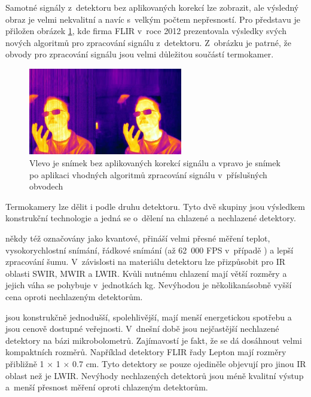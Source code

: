     Samotné signály z~detektoru bez aplikovaných korekcí lze zobrazit, ale výsledný obraz je velmi nekvalitní a navíc s~velkým počtem nepřesností. Pro představu je přiložen obrázek \ref{fig:flir_signal_image}, kde firma FLIR v~roce 2012 prezentovala výsledky svých nových algoritmů pro zpracování signálu z~detektoru.  Z~obrázku je patrné, že obvody pro zpracování signálu jsou velmi důležitou součástí termokamer.
    
    \begin{figure}[h]
      \centering
      \includegraphics[width=0.6\textwidth]{images/flir_filter_with_without.jpg}
      \caption{Vlevo je snímek bez aplikovaných korekcí signálu a vpravo je snímek po aplikaci vhodných algoritmů zpracování signálu v~příslušných obvodech \cite{flirFPGAsignal}}
      \label{fig:flir_signal_image}
	\end{figure}    
    
    Termokamery lze dělit i podle druhu detektoru. Tyto dvě skupiny jsou výsledkem konstrukční technologie a jedná se o~dělení na chlazené a nechlazené detektory.
        
	\begin{description}[align=left]\label{description:detector_types}
      \item [Chlazené detektory,] někdy též označovány jako kvantové, přináší velmi přesné měření teplot, vysokorychlostní snímání, řádkové snímání (až 62~000 FPS v~případě \cite{flirSc7000}) a lepší zpracování šumu. V~závislosti na materiálu detektoru lze přizpůsobit pro IR oblasti SWIR, MWIR a LWIR. Kvůli nutnému chlazení mají větší rozměry a jejich váha se pohybuje v~jednotkách kg. Nevýhodou je několikanásobně vyšší cena oproti nechlazeným detektorům.
      \item [Nechlazené detektory] jsou konstrukčně jednodušší, spolehlivější, mají menší energetickou spotřebu a jsou cenově dostupné veřejnosti. V~dnešní době jsou nejčastější nechlazené detektory na bázi mikrobolometrů. Zajímavostí je fakt, že se dá dosáhnout velmi kompaktních rozměrů. Například detektory FLIR řady Lepton mají rozměry přibližně 1 $\times$ 1 $\times$ 0.7 cm. Tyto detektory se pouze ojediněle objevují pro jinou IR oblast než je LWIR. Nevýhody nechlazených detektorů jsou méně kvalitní výstup a~menší přesnost měření oproti chlazeným detektorům.
    \end{description}
        
